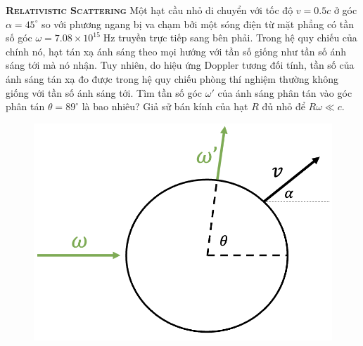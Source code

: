 

\begin{problem}
	
	\textbf{\textsc{Relativistic Scattering}} Một hạt cầu nhỏ di chuyển với tốc độ $v=0.5c$ ở góc $\alpha=45^{\circ}$ so với phương ngang bị va chạm bởi một sóng điện từ mặt phẳng có tần số góc $\omega=7.08\times 10^{15} \;\mathrm{Hz}$ truyền trực tiếp sang bên phải. Trong hệ quy chiếu của chính nó, hạt tán xạ ánh sáng theo mọi hướng với tần số giống như tần số ánh sáng tới mà nó nhận. Tuy nhiên, do hiệu ứng Doppler tương đối tính, tần số của ánh sáng tán xạ đo được trong hệ quy chiếu phòng thí nghiệm thường không giống với tần số ánh sáng tới. Tìm tần số góc $\omega'$ của ánh sáng phân tán vào góc phân tán $\theta=89^{\circ}$ là bao nhiêu? Giả sử bán kính của hạt $R$ đủ nhỏ để $R\omega \ll c$.
	\FloatBarrier
	\begin{figure}[h]
		\centering
		\includegraphics[width=0.4\linewidth]{problems/figures/rel_sca_fig.png}
		\label{fig:enter-label}
	\end{figure}
	\FloatBarrier
\end{problem}
